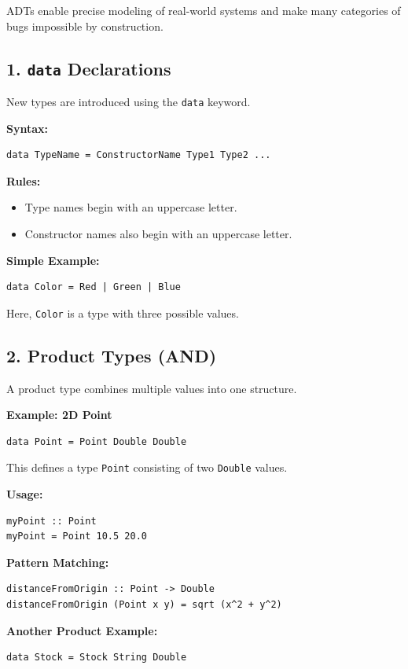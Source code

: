 \documentclass[12pt]{article}
\begin{document}
ADTs enable precise modeling of real-world systems and make many categories of bugs impossible by construction.

\subsection{1. \texttt{data} Declarations}

New types are introduced using the \texttt{data} keyword.

\textbf{Syntax:}
\begin{verbatim}
data TypeName = ConstructorName Type1 Type2 ...
\end{verbatim}

\textbf{Rules:}
\begin{itemize}
  \item Type names begin with an uppercase letter.
  \item Constructor names also begin with an uppercase letter.
\end{itemize}

\textbf{Simple Example:}
\begin{verbatim}
data Color = Red | Green | Blue
\end{verbatim}

Here, \texttt{Color} is a type with three possible values.

\subsection{2. Product Types (AND)}

A product type combines multiple values into one structure.

\textbf{Example: 2D Point}
\begin{verbatim}
data Point = Point Double Double
\end{verbatim}

This defines a type \texttt{Point} consisting of two \texttt{Double} values.

\textbf{Usage:}
\begin{verbatim}
myPoint :: Point
myPoint = Point 10.5 20.0
\end{verbatim}

\textbf{Pattern Matching:}
\begin{verbatim}
distanceFromOrigin :: Point -> Double
distanceFromOrigin (Point x y) = sqrt (x^2 + y^2)
\end{verbatim}

\textbf{Another Product Example:}
\begin{verbatim}
data Stock = Stock String Double
\end{verbatim}
\end{document}
